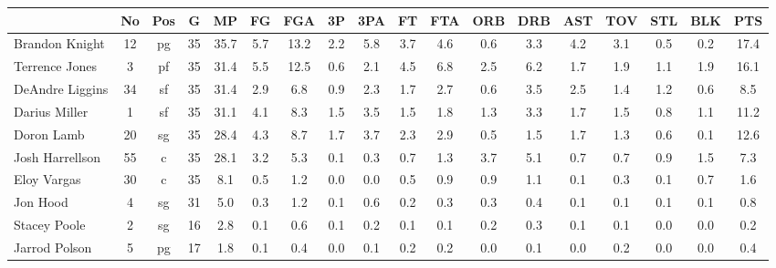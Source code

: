 \documentclass[10pt,letterpaper]{article}
\begin{document}
\begin{table}[ht]
\begin{center}
\begin{tabular}{lccccccccccccccccc}
  \hline
 & No & Pos & G & MP & FG & FGA & 3P & 3PA & FT & FTA & ORB & DRB & AST & TOV & STL & BLK & PTS \\ 
  \hline
Brandon Knight & 12 & pg & 35 & 35.7 & 5.7 & 13.2 & 2.2 & 5.8 & 3.7 & 4.6 & 0.6 & 3.3 & 4.2 & 3.1 & 0.5 & 0.2 & 17.4 \\ 
  Terrence Jones & 3 & pf & 35 & 31.4 & 5.5 & 12.5 & 0.6 & 2.1 & 4.5 & 6.8 & 2.5 & 6.2 & 1.7 & 1.9 & 1.1 & 1.9 & 16.1 \\ 
  DeAndre Liggins & 34 & sf & 35 & 31.4 & 2.9 & 6.8 & 0.9 & 2.3 & 1.7 & 2.7 & 0.6 & 3.5 & 2.5 & 1.4 & 1.2 & 0.6 & 8.5 \\ 
  Darius Miller & 1 & sf & 35 & 31.1 & 4.1 & 8.3 & 1.5 & 3.5 & 1.5 & 1.8 & 1.3 & 3.3 & 1.7 & 1.5 & 0.8 & 1.1 & 11.2 \\ 
  Doron Lamb & 20 & sg & 35 & 28.4 & 4.3 & 8.7 & 1.7 & 3.7 & 2.3 & 2.9 & 0.5 & 1.5 & 1.7 & 1.3 & 0.6 & 0.1 & 12.6 \\ 
  Josh Harrellson & 55 & c & 35 & 28.1 & 3.2 & 5.3 & 0.1 & 0.3 & 0.7 & 1.3 & 3.7 & 5.1 & 0.7 & 0.7 & 0.9 & 1.5 & 7.3 \\ 
  Eloy Vargas & 30 & c & 35 & 8.1 & 0.5 & 1.2 & 0.0 & 0.0 & 0.5 & 0.9 & 0.9 & 1.1 & 0.1 & 0.3 & 0.1 & 0.7 & 1.6 \\ 
  Jon Hood & 4 & sg & 31 & 5.0 & 0.3 & 1.2 & 0.1 & 0.6 & 0.2 & 0.3 & 0.3 & 0.4 & 0.1 & 0.1 & 0.1 & 0.1 & 0.8 \\ 
  Stacey Poole & 2 & sg & 16 & 2.8 & 0.1 & 0.6 & 0.1 & 0.2 & 0.1 & 0.1 & 0.2 & 0.3 & 0.1 & 0.1 & 0.0 & 0.0 & 0.2 \\ 
  Jarrod Polson & 5 & pg & 17 & 1.8 & 0.1 & 0.4 & 0.0 & 0.1 & 0.2 & 0.2 & 0.0 & 0.1 & 0.0 & 0.2 & 0.0 & 0.0 & 0.4 \\ 
   \hline
\end{tabular}
\end{center}
\end{table}
\end{document}
